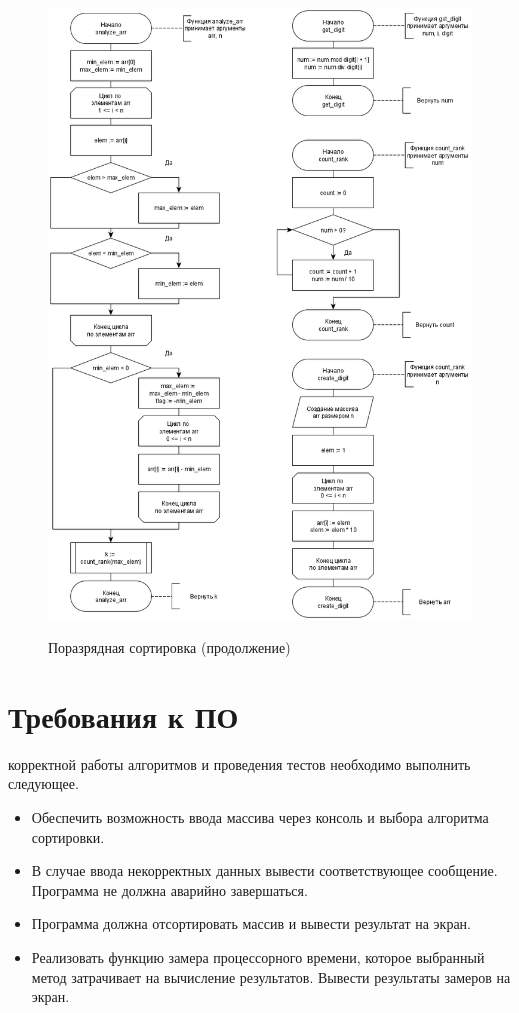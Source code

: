 \begin{figure}[h]
	\begin{center}
		{\includegraphics[scale = 0.53]{schemes/lsd_2}}
		\caption{Поразрядная сортировка (продолжение)}
		\label{fig4:image}
	\end{center}
\end{figure}


\section{Требования к ПО}
 корректной работы алгоритмов и проведения тестов необходимо выполнить следующее.
\begin{itemize}
	\item Обеспечить возможность ввода массива через консоль и выбора алгоритма сортировки.
	\item В случае ввода некорректных данных вывести соответствующее сообщение. Программа не должна аварийно завершаться.
	\item Программа должна отсортировать массив и вывести результат на экран.
	\item Реализовать функцию замера процессорного времени, которое выбранный метод затрачивает на вычисление результатов. Вывести результаты замеров на экран.
\end{itemize}

